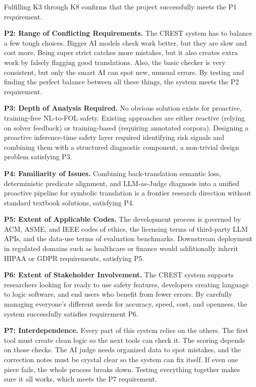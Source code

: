 Fulfilling K3 through K8 confirms that the project successfully meets the P1 requirement.

\textbf{P2: Range of Conflicting Requirements.}
The CREST system has to balance a few tough choices. Bigger AI models check work better, but they are slow and cost more. Being super strict catches more mistakes, but it also creates extra work by falsely flagging good translations. Also, the basic checker is very consistent, but only the smart AI can spot new, unusual errors. By testing and finding the perfect balance between all these things, the system meets the P2 requirement.

\textbf{P3: Depth of Analysis Required.}
No obvious solution exists for proactive, training-free NL-to-FOL safety. Existing approaches are either reactive (relying on solver feedback) or training-based (requiring annotated corpora). Designing a proactive inference-time safety layer required identifying risk signals and combining them with a structured diagnostic component, a non-trivial design problem satisfying P3.

\textbf{P4: Familiarity of Issues.}
Combining back-translation semantic loss, deterministic predicate alignment, and LLM-as-Judge diagnosis into a unified proactive pipeline for symbolic translation is a frontier research direction without standard textbook solutions, satisfying P4.

\textbf{P5: Extent of Applicable Codes.}
The development process is governed by ACM, ASME, and IEEE codes of ethics, the licensing terms of third-party LLM APIs, and the data-use terms of evaluation benchmarks. Downstream deployment in regulated domains such as healthcare or finance would additionally inherit HIPAA or GDPR requirements, satisfying P5.

\textbf{P6: Extent of Stakeholder Involvement.}
The CREST system supports researchers looking for ready to use safety features, developers creating language to logic software, and end users who benefit from fewer errors. By carefully managing everyone's different needs for accuracy, speed, cost, and openness, the system successfully satisfies requirement P6.

\textbf{P7: Interdependence.}
Every part of this system relies on the others. The first tool must create clean logic so the next tools can check it. The scoring depends on those checks. The AI judge needs organized data to spot mistakes, and the correction notes must be crystal clear so the system can fix itself. If even one piece fails, the whole process breaks down. Testing everything together makes sure it all works, which meets the P7 requirement.

